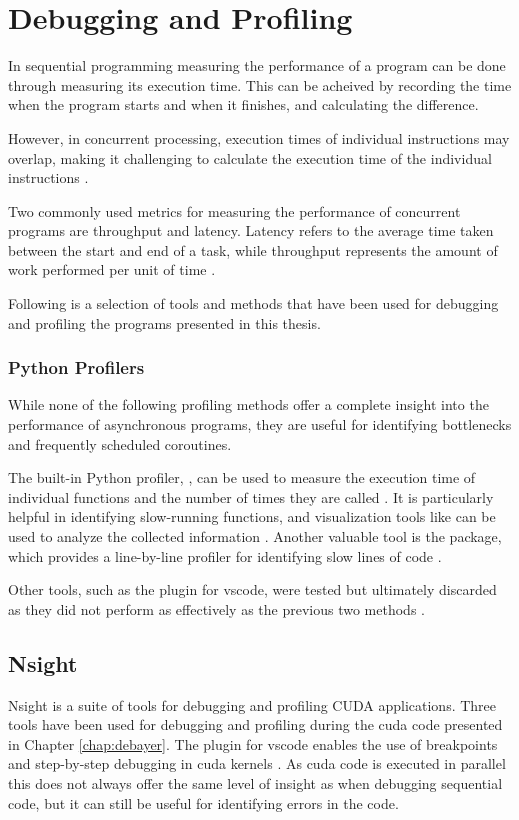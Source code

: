 
\section{Debugging and Profiling}
In sequential programming measuring the performance of a program can be done through measuring its execution time.
This can be acheived by recording the time when the program starts and when it finishes, and calculating the difference.

However, in concurrent processing, execution times of individual instructions may overlap, making it challenging to calculate the execution time of the individual instructions \cite[21]{volkovLatencyHiding2016}.

Two commonly used metrics for measuring the performance of concurrent programs are throughput and latency.
Latency refers to the average time taken between the start and end of a task, while throughput represents the amount of work performed per unit of time \cite[21-23]{volkovLatencyHiding2016}.

Following is a selection of tools and methods that have been used for debugging and profiling the programs presented in this thesis.

\subsubsection{Python Profilers}
While none of the following profiling methods offer a complete insight into the performance of asynchronous \py programs, they are useful for identifying bottlenecks and frequently scheduled coroutines.

The built-in Python profiler, , can be used to measure the execution time of individual functions and the number of times they are called \cite{pythonsoftwarefoundationPythonProfilers}.
It is particularly helpful in identifying slow-running functions, and visualization tools like  can be used to analyze the collected information \cite{davisSnakeViz2023}.
Another valuable tool is the  package, which provides a line-by-line profiler for identifying slow lines of code \cite{kernLineProfilerKernprof2023}.

Other tools, such as the  plugin for \gls{vscode}, were tested but ultimately discarded as they did not perform as effectively as the previous two methods \cite{tornettaAustinVSCode2023}.

\subsection{Nsight}
Nsight is a suite of tools for debugging and profiling CUDA applications.
Three tools have been used for debugging and profiling during the \gls{cuda} code presented in Chapter \ref{chap:debayer}.
The  plugin for \gls{vscode} enables the use of breakpoints and step-by-step debugging in \gls{cuda} kernels \cite{nvidiaNsightVisualStudio2021}.
As \gls{cuda} code is executed in parallel this does not always offer the same level of insight as when debugging sequential code, but it can still be useful for identifying errors in the code.

